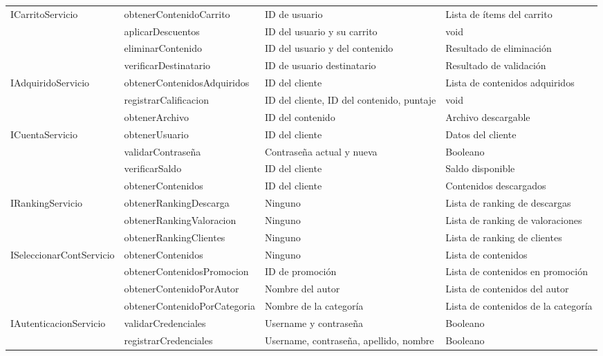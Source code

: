 \begin{longtable}{|p{5cm}|p{4cm}|p{3.5cm}|p{3.5cm}|}
\multirow{4}{5cm}{ICarritoServicio} 
    & obtenerContenidoCarrito & ID de usuario & Lista de ítems del carrito \\ \cline{2-4}
    & aplicarDescuentos & ID del usuario y su carrito & void \\ \cline{2-4}
    & eliminarContenido & ID del usuario y del contenido & Resultado de eliminación \\ \cline{2-4}
    & verificarDestinatario & ID de usuario destinatario & Resultado de validación \\ \hline
\multirow{3}{5cm}{IAdquiridoServicio} 
    & obtenerContenidosAdquiridos & ID del cliente & Lista de contenidos adquiridos \\ \cline{2-4}
    & registrarCalificacion & ID del cliente, ID del contenido, puntaje & void \\ \cline{2-4}
    & obtenerArchivo & ID del contenido & Archivo descargable \\ \hline
\multirow{4}{5cm}{ICuentaServicio} 
    & obtenerUsuario & ID del cliente & Datos del cliente \\ \cline{2-4}
    & validarContraseña & Contraseña actual y nueva & Booleano \\ \cline{2-4}
    & verificarSaldo & ID del cliente & Saldo disponible \\ \cline{2-4}
    & obtenerContenidos & ID del cliente & Contenidos descargados \\ \hline
\multirow{3}{5cm}{IRankingServicio} 
    & obtenerRankingDescarga & Ninguno & Lista de ranking de descargas \\ \cline{2-4}
    & obtenerRankingValoracion & Ninguno & Lista de ranking de valoraciones \\ \cline{2-4}
    & obtenerRankingClientes & Ninguno & Lista de ranking de clientes \\ \hline
\multirow{4}{5cm}{ISeleccionarContServicio} 
    & obtenerContenidos & Ninguno & Lista de contenidos \\ \cline{2-4}
    & obtenerContenidosPromocion & ID de promoción & Lista de contenidos en promoción \\ \cline{2-4}
    & obtenerContenidoPorAutor & Nombre del autor & Lista de contenidos del autor \\ \cline{2-4}
    & obtenerContenidoPorCategoria & Nombre de la categoría & Lista de contenidos de la categoría \\ \hline
\multirow{2}{5cm}{IAutenticacionServicio} 
    & validarCredenciales & Username y contraseña & Booleano \\ \cline{2-4}
    & registrarCredenciales & Username, contraseña, apellido, nombre & Booleano \\ \hline

\end{longtable}

